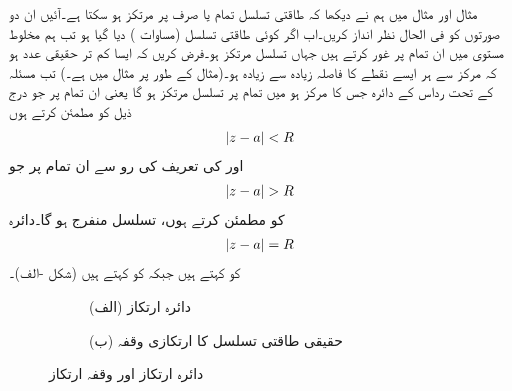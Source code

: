 مثال  اور مثال  میں ہم نے دیکھا کہ طاقتی تسلسل تمام  یا صرف  پر مرتکز ہو سکتا ہے۔آئیں ان دو صورتوں کو فی الحال نظر انداز کریں۔اب اگر کوئی  طاقتی تسلسل (مساوات ) دیا گیا ہو تب ہم مخلوط مستوی میں ان تمام  پر غور کرتے ہیں جہاں تسلسل مرتکز ہو۔فرض کریں کہ  ایسا کم تر حقیقی عدد ہو کہ مرکز  سے ہر ایسے نقطے کا فاصلہ زیادہ سے زیادہ  ہو۔(مثال کے طور پر مثال  میں  ہے۔)  تب مسئلہ  کے تحت رداس  کے دائرہ  جس کا مرکز  ہو میں تمام  پر تسلسل مرتکز ہو گا یعنی ان تمام  پر جو درج ذیل کو مطمئن کرتے ہوں
\begin{align}\label{مساوات_ٹیلر_رداس_مرکوزیت}
\abs{z-a}<R
\end{align}
اور  کی تعریف کی رو سے ان تمام  پر جو 
\begin{align*}
\abs{z-a}>R
\end{align*}
کو مطمئن کرتے ہوں، تسلسل منفرج ہو گا۔دائرہ
\begin{align*}
\abs{z-a}=R
\end{align*}
کو  کہتے ہیں جبکہ  کو  کہتے ہیں (شکل -الف)۔
\begin{figure}
\centering
\begin{subfigure}{0.5\textwidth}
\centering
{}
\caption*{(الف) دائرہ ارتکاز}
\end{subfigure}%
\begin{subfigure}{0.5\textwidth}
\centering
{}
\caption*{(ب) حقیقی طاقتی تسلسل کا ارتکازی وقفہ}
\end{subfigure}%
\caption{دائرہ ارتکاز اور وقفہ ارتکاز}
\label{شکل_ٹیلر_دائرہ_مرکوزیت_رداس_مرکوزیت}
\end{figure}

